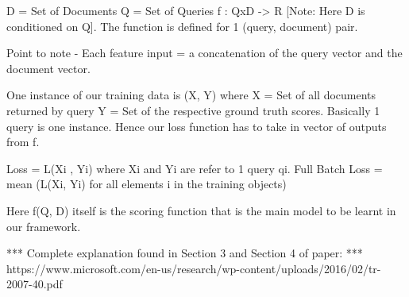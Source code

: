 \documentclass[12pt, twoside, ngerman]{report}
\begin{document}
    D = {Set of Documents}
    Q = {Set of Queries}
    f : QxD -> R [Note: Here D is conditioned on Q]. The function is defined for 1 (query, document) pair.

    Point to note - Each feature input = a concatenation of the query vector and the document vector.

    One instance of our training data is (X, Y) where X = {Set of all documents returned by query} Y = {Set of the respective ground
    truth scores}. Basically 1 query is one instance. Hence our loss function has to take in vector of outputs from f.

    Loss = L(Xi , Yi) where Xi and Yi are refer to 1 query qi.
    Full Batch Loss = mean (L(Xi, Yi) for all elements i in the training objects)

    Here f(Q, D) itself is the scoring function that is the main model to be learnt in our framework.

    *** Complete explanation found in Section 3 and Section 4 of paper:
        *** https://www.microsoft.com/en-us/research/wp-content/uploads/2016/02/tr-2007-40.pdf
\end{document}
